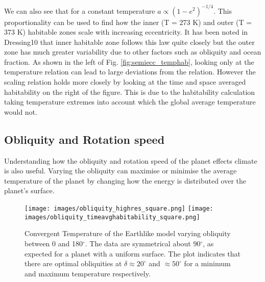 \documentclass[12pt, onecolumn]{revtex4-2}    %
\begin{document}
We can also see that for a constant temperature $a \propto (1-e^2)^{-1/4}$.
This proportionality can be used to find how the inner (T = 273 K) and outer (T = 373 K) habitable zones scale with increasing eccentricity.
It has been noted in Dressing10 that inner habitable zone follows this law quite closely but the outer zone has much greater variability due to other factors such as obliquity and ocean fraction.
As shown in the left of Fig. \ref{fig:semiecc_temphab}, looking only at the temperature relation can lead to large deviations from the relation.
However the scaling relation holds more closely by looking at the time and space averaged habitability on the right of the figure.
This is due to the habitability calculation taking temperature extremes into account which the global average temperature would not.

\subsection{Obliquity and Rotation speed} \label{ssec:obliqrotat}

Understanding how the obliquity and rotation speed of the planet effects climate is also useful.
Varying the obliquity can maximise or minimise the average temperature of the planet by changing how the energy is distributed over the planet's surface.


\begin{figure}
    \texttt{[image: images/obliquity\_highres\_square.png]}
    \texttt{[image: images/obliquity\_timeavghabitability\_square.png]}
    \caption{Convergent Temperature of the Earthlike model varying obliquity between 0 and 180$^{\circ}$.
        The data are symmetrical about 90$^{\circ}$, as expected for a planet with a uniform surface.
        The plot indicates that there are optimal obliquities at $\delta \approx 20^{\circ}$ and $\approx 50^{\circ}$ for a minimum and maximum temperature respectively.
    }
    \label{fig:temperature_obliquity}
\end{figure}

%     
\end{document}
